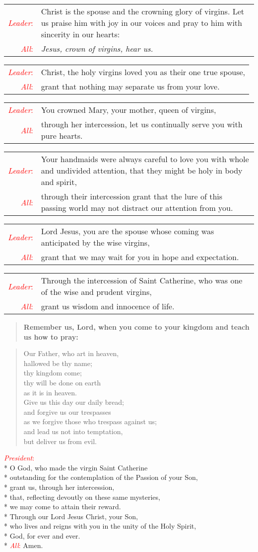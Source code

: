 \documentclass[letterpaper,14pt]{extarticle}
\newcommand{\side}[1]{\flagverse{\textcolor{red}{\textit{#1}}:}}
\newcommand{\sidestar}[1]{\textcolor{red}{\textit{#1}:}}
\newlength{\oldindent}
\newcommand{\antiphon}[2]{
	\setlength{\oldindent}{\vindent}
	\setlength{\vindent}{0em}
	\begin{verse}
	\side{#1} \textbf{#2}
	\end{verse}
	\setlength{\vindent}{\oldindent}
}
\newcommand{\intercession}[2]{
	\begin{tabular}[h]{r p{4.25in}}
		\sidestar{Leader} & #1 \\
		\sidestar{All} & #2
	\end{tabular}}
\begin{document}
\intercession{Christ is the spouse and the crowning glory of virgins.  Let us praise him with joy in our voices and pray to him with sincerity in our hearts:}
{\textit{Jesus, crown of virgins, hear us.}}

\intercession{Christ, the holy virgins loved you as their one true spouse,}
{grant that nothing may separate us from your love.}

\intercession{You crowned Mary, your mother, queen of virgins,}
{through her intercession, let us continually serve you with pure hearts.}

\intercession{Your handmaids were always careful to love you with whole and undivided attention, that they might be holy in body and spirit,}
{through their intercession grant that the lure of this passing world may not distract our attention from you.}

\intercession{Lord Jesus, you are the spouse whose coming was anticipated by the wise virgins,}
{grant that we may wait for you in hope and expectation.}

\intercession{Through the intercession of Saint Catherine, who was one of the wise and prudent virgins,}
{grant us wisdom and innocence of life.}

\antiphon{Leader}{Remember us, Lord, when you come to your kingdom and teach us how to pray:}
	
\begin{verse}
	\side{All} Our Father, who art in heaven,\\ %
hallowed be thy name; \\
thy kingdom come; \\
thy will be done on earth \\
as it is in heaven. \\
Give us this day our daily bread; \\
and forgive us our trespasses \\
as we forgive those who trespass against us; \\
and lead us not into temptation, \\
but deliver us from evil.
\end{verse}


\sidestar{President}\\*
O God, who made the virgin Saint Catherine \\*
outstanding for the contemplation of the Passion of your Son, \\*
grant us, through her intercession, \\*
that, reflecting devoutly on these same mysteries, \\*
we may come to attain their reward. \\*
Through our Lord Jesus Christ, your Son,\\*
who lives and reigns with you in the unity of the Holy Spirit,\\*
God, for ever and ever.\\*
\sidestar{All} Amen.
\end{document}
